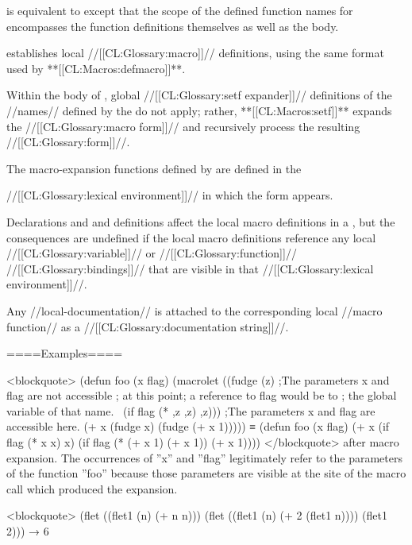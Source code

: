 
 is equivalent to  except that the scope of the defined function names for  encompasses the function definitions themselves as well as the body.


 establishes local //[[CL:Glossary:macro]]// definitions, using the same format used by **[[CL:Macros:defmacro]]**.

Within the body of , global //[[CL:Glossary:setf expander]]// definitions of the //names// defined by the  do not apply; rather, **[[CL:Macros:setf]]** expands the //[[CL:Glossary:macro form]]// and recursively process the resulting //[[CL:Glossary:form]]//.

The macro-expansion functions defined by  are defined in the

//[[CL:Glossary:lexical environment]]// in which the  form appears.

Declarations and  and  definitions affect the local macro definitions in a , but the consequences are undefined if the local macro definitions reference any local //[[CL:Glossary:variable]]// or //[[CL:Glossary:function]]// //[[CL:Glossary:bindings]]// that are visible in that //[[CL:Glossary:lexical environment]]//.

Any //local-documentation// is attached to the corresponding local //macro function// as a //[[CL:Glossary:documentation string]]//.

\endlist

====Examples====

<blockquote> (defun foo (x flag) (macrolet ((fudge (z) ;The parameters x and flag are not accessible ; at this point; a reference to flag would be to ; the global variable of that name. \bq\ (if flag (* ,z ,z) ,z))) ;The parameters x and flag are accessible here. (+ x (fudge x) (fudge (+ x 1))))) ≡ (defun foo (x flag) (+ x (if flag (* x x) x) (if flag (* (+ x 1) (+ x 1)) (+ x 1)))) </blockquote> after macro expansion. The occurrences of ''x'' and ''flag'' legitimately refer to the parameters of the function ''foo'' because those parameters are visible at the site of the macro call which produced the expansion.

<blockquote> (flet ((flet1 (n) (+ n n))) (flet ((flet1 (n) (+ 2 (flet1 n)))) (flet1 2))) → 6

